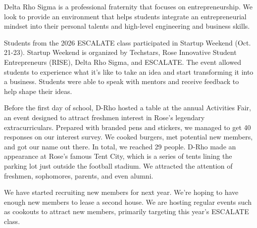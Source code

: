 \begin{minipage}[t]{.66\linewidth} %


Delta Rho Sigma is a professional fraternity that focuses on entrepreneurship. We look to provide an environment that helps students integrate an entrepreneurial mindset into their personal talents and high-level engineering and business skills.



Students from the 2026 ESCALATE class participated in Startup Weekend (Oct. 21-23). Startup Weekend is organized by Techstars, Rose Innovative Student Entrepreneurs (RISE), Delta Rho Sigma, and ESCALATE. The event allowed students to experience what it's like to take an idea and start transforming it into a business. Students were able to speak with mentors and receive feedback to help shape their ideas.



Before the first day of school, D-Rho hosted a table at the annual Activities Fair, an event designed to attract freshmen interest in Rose's legendary extracurriculars. Prepared with branded pens and stickers, we managed to get 40 responses on our interest survey.
We cooked burgers, met potential new members, and got our name out there. In total, we reached 29 people. 
D-Rho made an appearance at Rose's famous Tent City, which is a series of tents lining the parking lot just outside the football stadium. We attracted the attention of freshmen, sophomores, parents, and even alumni. 



We have started recruiting new members for next year. We're hoping to have enough new members to lease a second house. We are hosting regular events such as cookouts to attract new members, primarily targeting this year's ESCALATE class.


\end{minipage}
